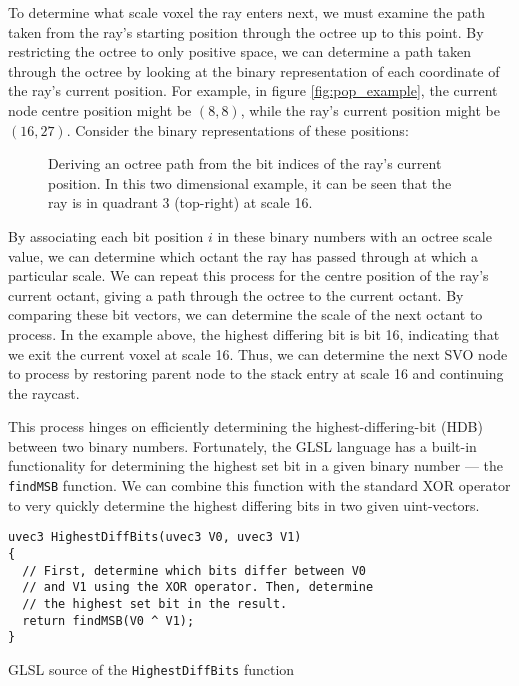 To determine what scale voxel the ray enters next, we must examine the path taken from the ray's starting position through the octree up to this point. By restricting the octree to only positive space, we can determine a path taken through the octree by looking at the binary representation of each coordinate of the ray's current position. For example, in figure \ref{fig:pop_example}, the current node centre position might be $(8, 8)$, while the ray's current position might be $(16, 27)$. Consider the binary representations of these positions:

\begin{figure}
    \small
    \centering
    
    \caption{Deriving an octree path from the bit indices of the ray's current position. In this two dimensional example, it can be seen that the ray is in quadrant 3 (top-right) at scale 16.}
    \label{fig:bit_positions_0}
\end{figure}

By associating each bit position $i$ in these binary numbers with an octree scale value, we can determine which octant the ray has passed through at which a particular scale. We can repeat this process for the centre position of the ray's current octant, giving a path through the octree to the current octant. By comparing these bit vectors, we can determine the scale of the next octant to process. In the example above, the highest differing bit is bit 16, indicating that we exit the current voxel at scale 16. Thus, we can determine the next SVO node to process by restoring parent node to the stack entry at scale 16 and continuing the raycast.

This process hinges on efficiently determining the highest-differing-bit (HDB) between two binary numbers. Fortunately, the GLSL language has a built-in functionality for determining the highest set bit in a given binary number --- the \texttt{findMSB} function. We can combine this function with the standard XOR operator to very quickly determine the highest differing bits in two given uint-vectors. 


\begin{listing}[ht]
\begin{verbatim}
uvec3 HighestDiffBits(uvec3 V0, uvec3 V1)
{
  // First, determine which bits differ between V0
  // and V1 using the XOR operator. Then, determine
  // the highest set bit in the result.
  return findMSB(V0 ^ V1);
}
\end{verbatim}
\caption{GLSL source of the \texttt{HighestDiffBits} function}
\label{listing:highestdiffbits_src}
\end{listing}


